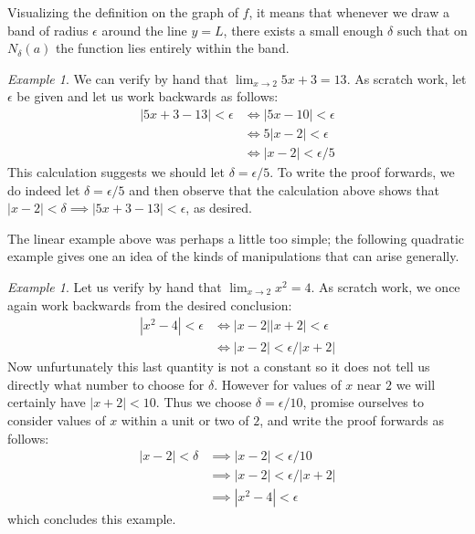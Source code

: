 \documentclass[11pt,oneside]{amsbook}
\theoremstyle{definition}
\theoremstyle{plain}
\theoremstyle{definition}
\theoremstyle{remark}
\newtheorem{example}[theorem]{Example}
\numberwithin{equation}{section}
\numberwithin{figure}{section}
\begin{document}
Visualizing the definition on the graph of $f$, it means that whenever we draw a band of radius $\epsilon$ around the line $y=L$, there exists a small enough $\delta$ such that on $N_\delta(a)$ the function lies entirely within the band.
\begin{center}
\end{center}

\begin{example}
  We can verify by hand that $\lim_{x\to2}5x+3=13$. As scratch work, let $\epsilon$ be given and let us work backwards as follows:
  \begin{align*}
    |5x+3-13|<\epsilon&\iff|5x-10|<\epsilon\\
                      &\iff5|x-2|<\epsilon\\
                      &\iff|x-2|<\epsilon/5
  \end{align*}
  This calculation suggests we should let $\delta=\epsilon/5$. To write the proof forwards, we do indeed let $\delta=\epsilon/5$ and then observe that the calculation above shows that $|x-2|<\delta\implies|5x+3-13|<\epsilon$, as desired.
\end{example}

The linear example above was perhaps a little too simple; the following quadratic example gives one an idea of the kinds of manipulations that can arise generally.

\begin{example}
  Let us verify by hand that $\lim_{x\to2}x^2=4$. As scratch work, we once again work backwards from the desired conclusion:
  \begin{align*}
    |x^2-4|<\epsilon&\iff |x-2||x+2|<\epsilon\\
                    &\iff |x-2|<\epsilon/|x+2|
  \end{align*}
  Now unfurtunately this last quantity is not a constant so it does not tell us directly what number to choose for $\delta$. However for values of $x$ near $2$ we will certainly have $|x+2|<10$. Thus we choose $\delta=\epsilon/10$, promise ourselves to consider values of $x$ within a unit or two of $2$, and write the proof forwards as follows:
  \begin{align*}
    |x-2|<\delta &\implies |x-2|<\epsilon/10\\
                 &\implies |x-2|<\epsilon/|x+2|\\
                 &\implies |x^2-4|<\epsilon
  \end{align*}
  which concludes this example.
\end{example}
\end{document}
